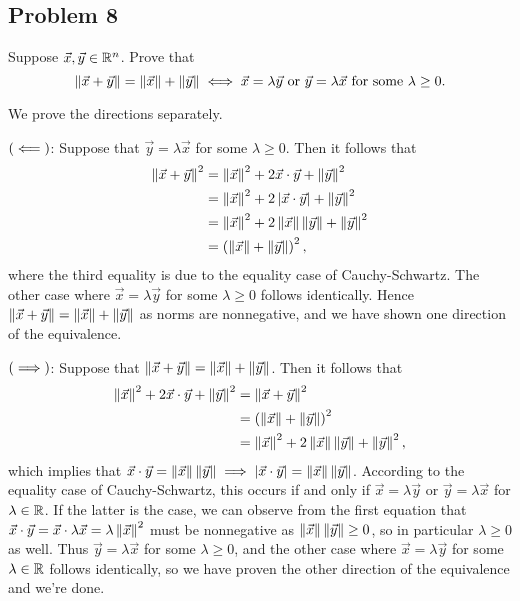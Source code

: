 \documentclass[main.tex]{subfiles}
\begin{document}
\subsection{Problem 8}
\begin{claim}
    Suppose $\vec{x}, \vec{y} \in\mathbb R^n$. Prove that
    \[\left\lVert \vec{x} + \vec{y} \right\rVert = \left\lVert \vec{x} \right\rVert + \left\lVert \vec{y} \right\rVert \iff \vec{x} = \lambda \vec{y}\text{ or }\vec{y} = \lambda\vec{x}\text{ for some }\lambda \ge 0.\]
\end{claim}

\begin{soln}
    We prove the directions separately.

    $\left( \impliedby \right)$: Suppose that $\vec{y} = \lambda\vec{x}$ for some $\lambda\ge 0$. Then it follows that 
    \begin{align*}
        \left\lVert \vec{x} + \vec{y} \right\rVert^2 &= \left\lVert \vec{x} \right\rVert^2 + 2\vec{x}\cdot \vec{y} + \left\lVert \vec{y} \right\rVert^2 \\
        &= \left\lVert \vec{x} \right\rVert^2 + 2\left\lvert \vec{x}\cdot \vec{y} \right\rvert + \left\lVert \vec{y} \right\rVert^2 \\
        &= \left\lVert \vec{x} \right\rVert^2 + 2\left\lVert \vec{x} \right\rVert \left\lVert \vec{y} \right\rVert + \left\lVert \vec{y} \right\rVert^2 \\
        &=\left( \left\lVert \vec{x} \right\rVert + \left\lVert \vec{y} \right\rVert \right)^2,
    \end{align*}
    where the third equality is due to the equality case of Cauchy-Schwartz. The other case where $\vec{x} = \lambda\vec{y}$ for some $\lambda\ge 0$ follows identically. Hence $\left\lVert \vec{x} + \vec{y} \right\rVert = \left\lVert \vec{x} \right\rVert + \left\lVert \vec{y} \right\rVert$ as norms are nonnegative, and we have shown one direction of the equivalence.

    $\left( \implies \right)$: Suppose that $\left\lVert \vec{x} + \vec{y} \right\rVert = \left\lVert \vec{x} \right\rVert + \left\lVert \vec{y} \right\rVert$. Then it follows that
    \begin{align*}
        \left\lVert \vec{x} \right\rVert^2 + 2\vec{x}\cdot \vec{y} + \left\lVert \vec{y} \right\rVert^2 &= \left\lVert \vec{x} + \vec{y} \right\rVert^2 \\
        &=\left( \left\lVert \vec{x} \right\rVert + \left\lVert \vec{y} \right\rVert \right)^2 \\
        &= \left\lVert \vec{x} \right\rVert^2 + 2\left\lVert \vec{x} \right\rVert \left\lVert \vec{y} \right\rVert + \left\lVert \vec{y} \right\rVert^2,
    \end{align*}
    which implies that $\vec{x}\cdot \vec{y} = \left\lVert \vec{x} \right\rVert \left\lVert \vec{y} \right\rVert \implies \left\lvert \vec{x}\cdot \vec{y} \right\rvert = \left\lVert \vec{x} \right\rVert \left\lVert \vec{y} \right\rVert$. According to the equality case of Cauchy-Schwartz, this occurs if and only if $\vec{x} = \lambda\vec{y}$ or $\vec{y} = \lambda\vec{x}$ for $\lambda\in \mathbb R$. If the latter is the case, we can observe from the first equation that $\vec{x}\cdot \vec{y} = \vec{x}\cdot \lambda \vec{x} = \lambda \left\lVert \vec{x} \right\rVert^2$ must be nonnegative as $\left\lVert \vec{x} \right\rVert \left\lVert \vec{y} \right\rVert \ge 0$, so in particular $\lambda\ge 0$ as well. Thus $\vec{y} = \lambda \vec{x}$ for some $\lambda \ge 0$, and the other case where $\vec{x} = \lambda\vec{y}$ for some $\lambda\in \mathbb R$ follows identically, so we have proven the other direction of the equivalence and we're done.
\end{soln}
\eject
\end{document}
